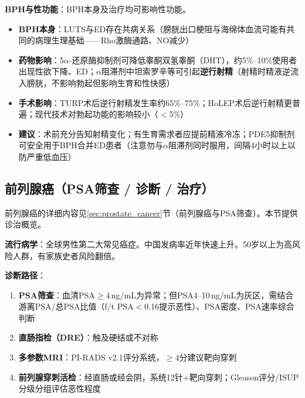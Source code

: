 \textbf{BPH与性功能}：BPH本身及治疗均可影响性功能。
\begin{itemize}[leftmargin=2cm]
	\item \textbf{BPH本身}：LUTS与ED存在共病关系（膀胱出口梗阻与海绵体血流可能有共同的病理生理基础——Rho激酶通路、NO减少）
	\item \textbf{药物影响}：5$\alpha$-还原酶抑制剂可降低睾酮双氢睾酮（DHT），约5\%--10\%使用者出现性欲下降、ED；$\alpha$阻滞剂中坦索罗辛等可引起\textbf{逆行射精}（射精时精液逆流入膀胱，不影响勃起但影响生育和性快感）
	\item \textbf{手术影响}：TURP术后逆行射精发生率约65\%--75\%；HoLEP术后逆行射精更普遍；现代技术对勃起功能的影响较小（$<$5\%）
	\item \textbf{建议}：术前充分告知射精变化；有生育需求者应提前精液冷冻；PDE5抑制剂可安全用于BPH合并ED患者（注意勿与$\alpha$阻滞剂同时服用，间隔4小时以上以防严重低血压）
\end{itemize}

\subsection{前列腺癌（PSA筛查 / 诊断 / 治疗）}

前列腺癌的详细内容见\ref{sec:prostate_cancer}节（前列腺癌与PSA筛查）。本节提供诊治概览。

\textbf{流行病学}：全球男性第二大常见癌症。中国发病率近年快速上升。50岁以上为高风险人群，有家族史者风险翻倍。

\textbf{诊断路径}：
\begin{enumerate}
	\item \textbf{PSA筛查}：血清PSA$\ge$4\,ng/mL为异常；但PSA4--10\,ng/mL为灰区，需结合游离PSA/总PSA比值（f/t PSA$<$0.16提示恶性）、PSA密度、PSA速率综合判断
	\item \textbf{直肠指检（DRE）}：触及硬结或不对称
	\item \textbf{多参数MRI}：PI-RADS v2.1评分系统，$\ge$4分建议靶向穿刺
	\item \textbf{前列腺穿刺活检}：经直肠或经会阴，系统12针+靶向穿刺；Gleason评分/ISUP分级分组评估恶性程度
\end{enumerate}

